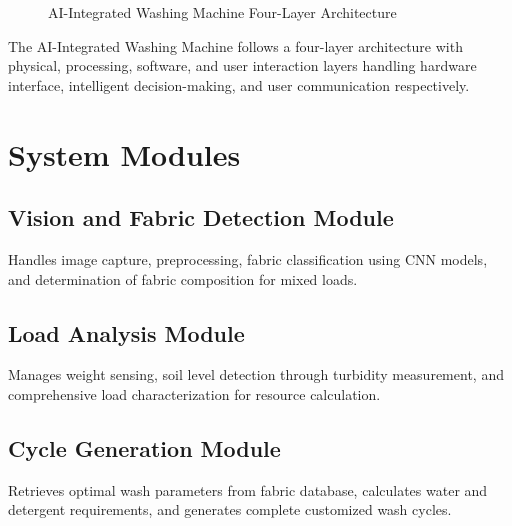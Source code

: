 \begin{figure}[H]
\centering
{}
\caption{AI-Integrated Washing Machine Four-Layer Architecture}
\label{fig:architecture}
\end{figure}

The AI-Integrated Washing Machine follows a four-layer architecture with physical, processing, software, and user interaction layers handling hardware interface, intelligent decision-making, and user communication respectively.

\section{System Modules}

\subsection{Vision and Fabric Detection Module}
Handles image capture, preprocessing, fabric classification using CNN models, and determination of fabric composition for mixed loads.

\subsection{Load Analysis Module}
Manages weight sensing, soil level detection through turbidity measurement, and comprehensive load characterization for resource calculation.

\subsection{Cycle Generation Module}
Retrieves optimal wash parameters from fabric database, calculates water and detergent requirements, and generates complete customized wash cycles.

